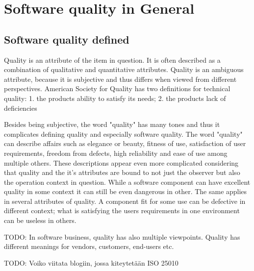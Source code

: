 \section{Software quality in General}
 
\subsection{Software quality defined}

Quality is an attribute of the item in question. It is often described as a combination of qualitative and quantitative attributes. Quality is an ambiguous attribute, because it is subjective and thus differs when viewed from different perspectives. American Society for Quality has two definitions for technical quality: 1. the products ability to satisfy its needs; 2. the products lack of deficiencies~\cite{ASQglossary}

Besides being subjective, the word "quality" has many tones and thus it complicates defining quality and especially software quality. The word "quality" can describe affairs such as elegance or beauty, fitness of use, satisfaction of user requirements, freedom from defects, high reliability and ease of use among multiple others. These descriptions appear even more complicated considering that quality and the it's attributes are bound to not just the observer but also the operation context in question. While a software component can have excellent quality in some context it can still be even dangerous in other. The same applies in several attributes of quality. A component fit for some use can be defective in different context; what is satisfying the users requirements in one environment can be useless in others.~\cite{jones2011economics}

TODO: In software business, quality has also multiple viewpoints. Quality has different meanings for vendors, customers, end-users etc. 



TODO: Voiko viitata blogiin, jossa kiteytetään ISO 25010
 




